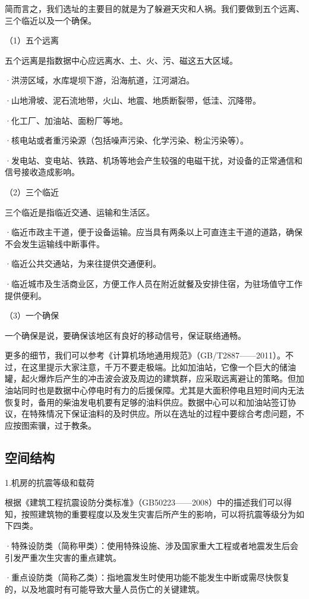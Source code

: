 \documentclass[12pt,UTF8]{ctexbook}
\begin{document}
简而言之，我们选址的主要目的就是为了躲避天灾和人祸。我们要做到五个远离、三个临近以及一个确保。

（1）五个远离

五个远离是指数据中心应远离水、土、火、污、磁这五大区域。

·洪涝区域，水库堤坝下游，沿海航道，江河湖泊。

·山地滑坡、泥石流地带，火山、地震、地质断裂带，低洼、沉降带。

·化工厂、加油站、面粉厂等地。

·核电站或者重污染源（包括噪声污染、化学污染、粉尘污染等）。

·发电站、变电站、铁路、机场等地会产生较强的电磁干扰，对设备的正常通信和信号接收造成影响。

（2）三个临近

三个临近是指临近交通、运输和生活区。

·临近市政主干道，便于设备运输。应当具有两条以上可直连主干道的道路，确保不会发生运输线中断事件。

·临近公共交通站，为来往提供交通便利。

·临近城市及生活商业区，方便工作人员在附近就餐及安排住宿，为驻场值守工作提供便利。

（3）一个确保

一个确保是说，要确保该地区有良好的移动信号，保证联络通畅。

更多的细节，我们可以参考《计算机场地通用规范》（GB/T2887——2011）。不过，在这里提示大家注意，千万不要走极端。比如加油站，它像一个巨大的储油罐，起火爆炸后产生的冲击波会波及周边的建筑群，应采取远离避让的策略。但加油站同时也是数据中心停电时有力的后援保障。尤其是大面积停电且短时间内无法恢复时，备用的柴油发电机要有足够的油料供应。数据中心可以和加油站签订协议，在特殊情况下保证油料的及时供应。所以在选址的过程中要综合考虑问题，不应按图索骥，过于教条。

\subsection{空间结构}

1.机房的抗震等级和载荷

根据《建筑工程抗震设防分类标准》（GB50223——2008）中的描述我们可以得知，按照建筑物的重要程度以及发生灾害后所产生的影响，可以将抗震等级分为如下四类。

·特殊设防类（简称甲类）：使用特殊设施、涉及国家重大工程或者地震发生后会引发严重次生灾害的重点建筑。

·重点设防类（简称乙类）：指地震发生时使用功能不能发生中断或需尽快恢复的，以及地震时有可能导致大量人员伤亡的关键建筑。
\end{document}

